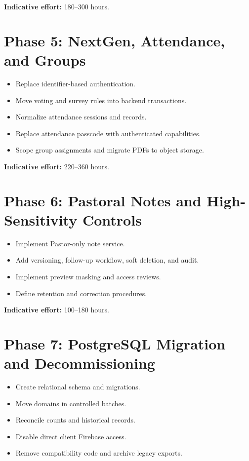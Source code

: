 \documentclass[11pt,a4paper,oneside]{report}
\begin{document}
\textbf{Indicative effort:} 180--300 hours.

\section{Phase 5: NextGen, Attendance, and Groups}

\begin{itemize}
  \item Replace identifier-based authentication.
  \item Move voting and survey rules into backend transactions.
  \item Normalize attendance sessions and records.
  \item Replace attendance passcode with authenticated capabilities.
  \item Scope group assignments and migrate PDFs to object storage.
\end{itemize}

\textbf{Indicative effort:} 220--360 hours.

\section{Phase 6: Pastoral Notes and High-Sensitivity Controls}

\begin{itemize}
  \item Implement Pastor-only note service.
  \item Add versioning, follow-up workflow, soft deletion, and audit.
  \item Implement preview masking and access reviews.
  \item Define retention and correction procedures.
\end{itemize}

\textbf{Indicative effort:} 100--180 hours.

\section{Phase 7: PostgreSQL Migration and Decommissioning}

\begin{itemize}
  \item Create relational schema and migrations.
  \item Move domains in controlled batches.
  \item Reconcile counts and historical records.
  \item Disable direct client Firebase access.
  \item Remove compatibility code and archive legacy exports.
\end{itemize}
\end{document}
